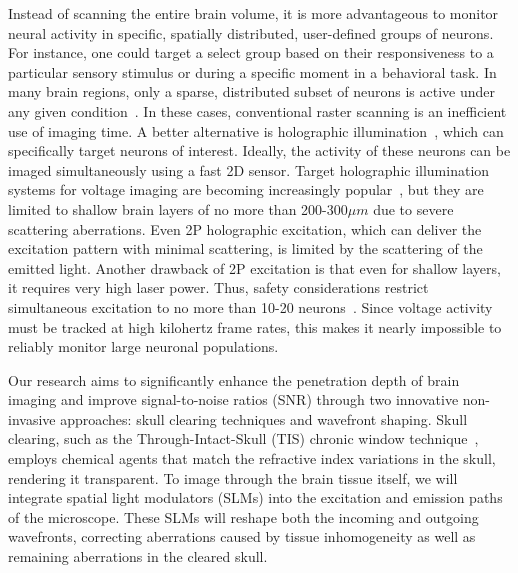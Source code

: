 Instead of scanning the entire brain volume, it is more advantageous to monitor neural activity in specific, spatially distributed, user-defined groups of neurons. For instance, one could target a select group based on their responsiveness to a particular sensory stimulus or during a specific moment in a behavioral task. In many brain regions, only a sparse, distributed subset of neurons is active under any given condition~\cite{poo2009odor,diamantaki2016sparse,hromadka2008sparse,crochet2011synaptic,peron2015cellular,tang2018large}. In these cases, conventional raster scanning is an inefficient use of imaging time. A better alternative is holographic illumination~\cite{Yang2018Holographic,mardinly2018precise,pegard2017three,hernandez2016three,nikolenko2008slm,dal2010simultaneous,ronzitti2017recent,vaziri2012reshaping,yang2016simultaneous,dana2014hybrid,dana2012remotely}, which can specifically target neurons of interest. Ideally, the activity of these neurons can be imaged simultaneously using a fast 2D sensor. Target holographic illumination systems for voltage imaging are becoming increasingly popular~\cite{Sims2024Scanless,Xiao2024LargeScale}, but they are limited to shallow brain layers of no more than 200-300$\mu m$  due to severe scattering aberrations. Even 2P holographic excitation, which can deliver the excitation pattern with minimal scattering, is limited by the scattering of the emitted light. Another drawback of 2P excitation is that even for shallow layers, it requires very high laser power. Thus, safety considerations restrict simultaneous excitation to no more than 10-20 neurons~\cite{Davis2024Optical}. Since voltage activity must be tracked at high kilohertz frame rates, this makes it nearly impossible to reliably monitor large neuronal populations.



Our research aims to significantly enhance the penetration depth of brain imaging and improve signal-to-noise ratios (SNR) through two innovative non-invasive approaches: skull clearing techniques and wavefront shaping. Skull clearing, such as the Through-Intact-Skull (TIS) chronic window technique~\cite{Li2022TIS}, employs chemical agents that match the refractive index variations in the skull, rendering it transparent. To image through the brain tissue itself, we will integrate spatial light modulators (SLMs) into the excitation and emission paths of the microscope. These SLMs will reshape both the incoming and outgoing wavefronts, correcting aberrations caused by tissue inhomogeneity as well as remaining aberrations in the cleared skull.

